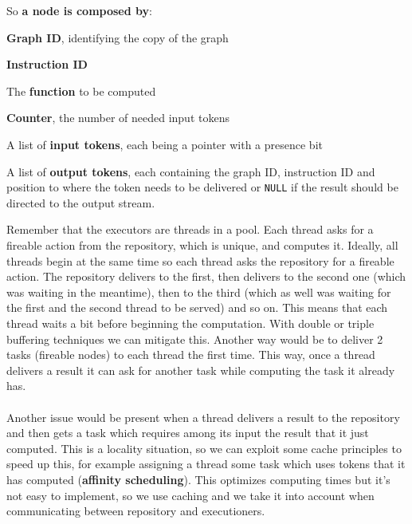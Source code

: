 \documentclass[10pt]{report}
\begin{document}
So \textbf{a node is composed by}:
\begin{list}{}{}
	\item \textbf{Graph ID}, identifying the copy of the graph
	\item \textbf{Instruction ID}
	\item The \textbf{function} to be computed 
	\item \textbf{Counter}, the number of needed input tokens
	\item A list of \textbf{input tokens}, each being a pointer with a presence bit
	\item A list of \textbf{output tokens}, each containing the graph ID, instruction ID and position to where the token needs to be delivered or \texttt{NULL} if the result should be directed to the output stream.
\end{list}
Remember that the executors are threads in a pool. Each thread asks for a fireable action from the repository, which is unique, and computes it. Ideally, all threads begin at the same time so each thread asks the repository for a fireable action. The repository delivers to the first, then delivers to the second one (which was waiting in the meantime), then to the third (which as well was waiting for the first and the second thread to be served) and so on. This means that each thread waits a bit before beginning the computation. With double or triple buffering techniques we can mitigate this. Another way would be to deliver 2 tasks (fireable nodes) to each thread the first time. This way, once a thread delivers a result it can ask for another task while computing the task it already has.\\\\
Another issue would be present when a thread delivers a result to the repository and then gets a task which requires among its input the result that it just computed. This is a locality situation, so we can exploit some cache principles to speed up this, for example assigning a thread some task which uses tokens that it has computed (\textbf{affinity scheduling}). This optimizes computing times but it's not easy to implement, so we use caching and we take it into account when communicating between repository and executioners.
\end{document}
